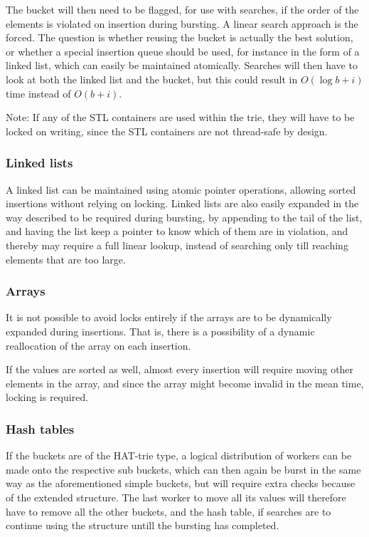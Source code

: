 The bucket will then need to be flagged, for use with searches, if the order of
the elements is violated on insertion during bursting. A linear search approach
is the forced. The question is whether reusing the bucket is actually the best
solution, or whether a special insertion queue should be used, for instance in
the form of a linked list, which can easily be maintained atomically. Searches
will then have to look at both the linked list and the bucket, but this could
result in $O(\log b + i)$ time instead of $O(b+i)$.

{ Note:} If any  of the STL containers are used within the trie, they will
have to be locked on writing, since the STL containers are not thread-safe by
design.

\subsubsection{Linked lists}
A linked list can be maintained using atomic pointer operations, allowing
sorted insertions without relying on locking.
Linked lists are also easily expanded in the way described to be required during
bursting, by appending to the tail of the list, and having the list keep a
pointer to know which of them are in violation, and thereby may require a
full linear lookup, instead of searching only till reaching elements that are
too large.

\subsubsection{Arrays}
It is not possible to avoid locks entirely if the arrays are to be dynamically
expanded during insertions. That is, there is a possibility of a dynamic
reallocation of the array on each insertion.

If the values are sorted as well, almost every insertion will require moving
other elements in the array, and since the array might become invalid in the
mean time, locking is required.

\subsubsection{Hash tables}
If the buckets are of the HAT-trie type, a logical distribution of workers
can be made onto the respective sub buckets, which can then again be burst in
the same way as the aforementioned simple buckets, but will require extra checks
because of the extended structure. The last worker to move all its values will
therefore have to remove all the other buckets, and the hash table, if searches
are to continue using the structure untill the bursting has completed.

